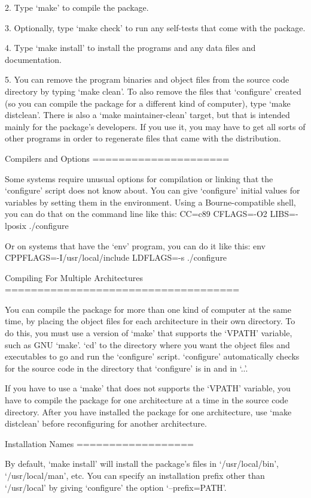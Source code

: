 \begin{DoxyCodeInclude}
  2. Type `make' to compile the package.

  3. Optionally, type `make check' to run any self-tests that come with
     the package.

  4. Type `make install' to install the programs and any data files and
     documentation.

  5. You can remove the program binaries and object files from the
     source code directory by typing `make clean'.  To also remove the
     files that `configure' created (so you can compile the package for
     a different kind of computer), type `make distclean'.  There is
     also a `make maintainer-clean' target, but that is intended mainly
     for the package's developers.  If you use it, you may have to get
     all sorts of other programs in order to regenerate files that came
     with the distribution.

Compilers and Options
=====================

   Some systems require unusual options for compilation or linking that
the `configure' script does not know about.  You can give `configure'
initial values for variables by setting them in the environment.  Using
a Bourne-compatible shell, you can do that on the command line like
this:
     CC=c89 CFLAGS=-O2 LIBS=-lposix ./configure

Or on systems that have the `env' program, you can do it like this:
     env CPPFLAGS=-I/usr/local/include LDFLAGS=-s ./configure

Compiling For Multiple Architectures
====================================

   You can compile the package for more than one kind of computer at the
same time, by placing the object files for each architecture in their
own directory.  To do this, you must use a version of `make' that
supports the `VPATH' variable, such as GNU `make'.  `cd' to the
directory where you want the object files and executables to go and run
the `configure' script.  `configure' automatically checks for the
source code in the directory that `configure' is in and in `..'.

   If you have to use a `make' that does not supports the `VPATH'
variable, you have to compile the package for one architecture at a time
in the source code directory.  After you have installed the package for
one architecture, use `make distclean' before reconfiguring for another
architecture.

Installation Names
==================

   By default, `make install' will install the package's files in
`/usr/local/bin', `/usr/local/man', etc.  You can specify an
installation prefix other than `/usr/local' by giving `configure' the
option `--prefix=PATH'.


\end{DoxyCodeInclude}
